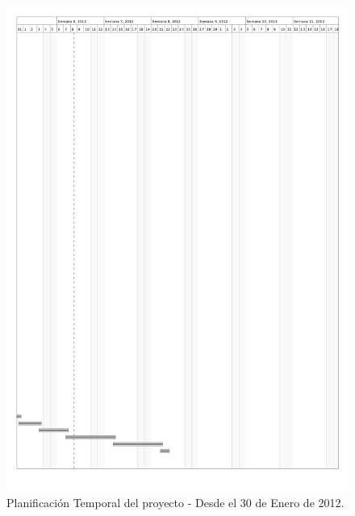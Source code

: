 \pagebreak
\begin{figure}[H]
\begin{center}
\includegraphics[width=15.5cm]{planificacion_graphvisualx_7.png}
\caption{Planificación Temporal del proyecto - Desde el 30 de Enero de 2012.}
\end{center}
\end{figure}

